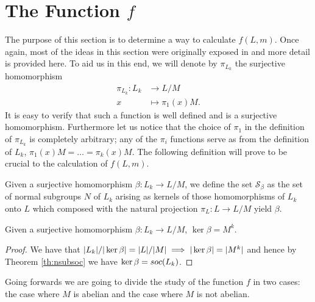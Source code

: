 \chapter{The Function \texorpdfstring{$f$}{f}}

The purpose of this section is to determine a way to calculate $f(L,m)$. Once again, most of the ideas in this section were originally exposed in \cite{DallaVoltaFGNMGAPQ} and more detail is provided here.
To aid us in this end, we will denote by $\pi_{L_k}$ the surjective homomorphism
\begin{align*}
    \pi_{L_k} \colon L_k &\rightarrow L/M \\
                        x &\mapsto \pi_1(x)M.
\end{align*}
It is easy to verify that such a function is well defined and is a surjective homomorphism. Furthermore let us notice that the choice of $\pi_1$ in the definition of $\pi_{L_k}$ is completely arbitrary; any of the $\pi_i$ functions serve as from the definition of $L_k$, 
$\pi_1(x)M = \ldots  = \pi_k(x)M$.
The following definition will prove to be crucial to the calculation of $f(L,m)$.
\begin{definition}
    Given a surjective homomorphism $\beta \colon L_k \rightarrow L/M$, we define the set $\mathscr{S}_\beta$ as the set of normal subgroups $N$ of $L_k$ arising as kernels of those homomorphisms of $L_k$ onto $L$ which composed with the natural projection $\pi_L \colon L \rightarrow L/M$ yield $\beta$.
\end{definition}

\begin{theorem}
    Given a surjective homomorphism $\beta \colon L_k \rightarrow L/M$, $\ker \beta = M^k$.
\end{theorem}

\begin{proof}
    We have that $| L_k |/| \ker \beta | = | L |/| M | \implies | \ker \beta | = | M^k |$ and hence by Theorem \ref{th:nsubsoc} we have $\ker \beta = soc {(L_k)}$.
\end{proof}

Going forwards we are going to divide the study of the function $f$ in two cases: the case where $M$ is abelian and the case where $M$ is not abelian.




